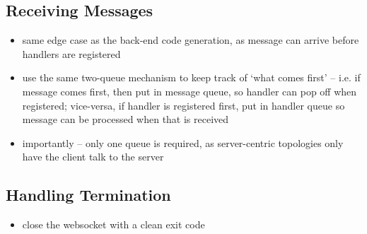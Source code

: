\subsection{Receiving Messages}
\begin{itemize}
\item same edge case as the back-end code generation, as message can arrive before handlers are registered
\item use the same two-queue mechanism to keep track of `what comes first' -- i.e. if message comes first, then put in message queue, so handler can pop off when registered; vice-versa, if handler is registered first, put in handler queue so message can be processed when that is received
\item importantly -- only one queue is required, as server-centric topologies only have the client talk to the server
\end{itemize}

\subsection{Handling Termination}
\begin{itemize}
\item close the websocket with a clean exit code
\end{itemize}